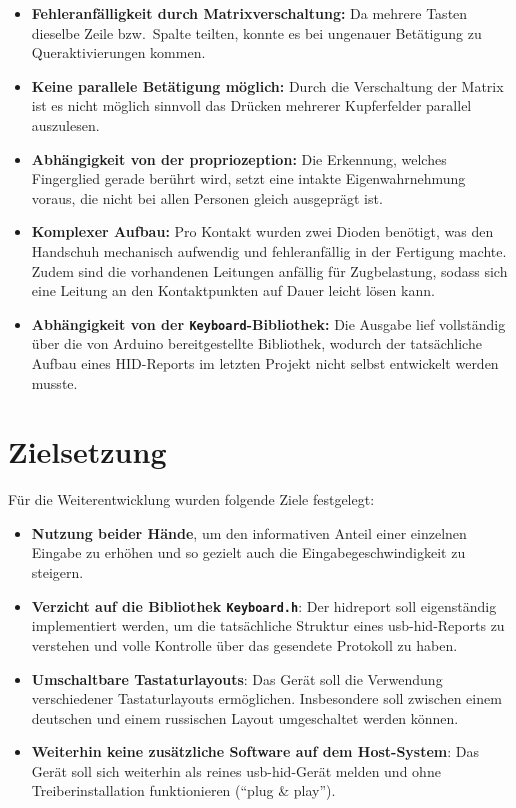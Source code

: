 \documentclass{article}
\begin{document}
\begin{itemize}
    \item \textbf{Fehleranfälligkeit durch Matrixverschaltung:} Da mehrere Tasten dieselbe Zeile bzw.\ Spalte teilten, konnte es bei ungenauer Betätigung zu Queraktivierungen kommen.
    \item \textbf{Keine parallele Betätigung möglich:} Durch die Verschaltung der Matrix ist es nicht möglich sinnvoll das Drücken mehrerer Kupferfelder parallel auszulesen.
    \item \textbf{Abhängigkeit von der \gls{propriozeption}:} Die Erkennung, welches Fingerglied gerade berührt wird, setzt eine intakte Eigenwahrnehmung voraus, die nicht bei allen Personen gleich ausgeprägt ist.
    \item \textbf{Komplexer Aufbau:} Pro Kontakt wurden zwei Dioden benötigt, was den Handschuh mechanisch aufwendig und fehleranfällig in der Fertigung machte. Zudem sind die vorhandenen Leitungen anfällig für Zugbelastung, sodass sich eine Leitung an den Kontaktpunkten auf Dauer leicht lösen kann.
    \item \textbf{Abhängigkeit von der \texttt{Keyboard}-Bibliothek:} Die Ausgabe lief vollständig über die von Arduino bereitgestellte Bibliothek, wodurch der tatsächliche Aufbau eines HID-Reports im letzten Projekt nicht selbst entwickelt werden musste.
\end{itemize}

\section{Zielsetzung}
\label{sec:zielsetzung}
Für die Weiterentwicklung wurden folgende Ziele festgelegt:

\begin{itemize}
    \item \textbf{Nutzung beider Hände}, um den informativen Anteil einer einzelnen Eingabe zu erhöhen und so gezielt auch die Eingabegeschwindigkeit zu steigern.
    \item \textbf{Verzicht auf die Bibliothek \texttt{Keyboard.h}}: Der \gls{hidreport} soll eigenständig implementiert werden, um die tatsächliche Struktur eines \gls{usb-hid}-Reports zu verstehen und volle Kontrolle über das gesendete Protokoll zu haben.
    \item \textbf{Umschaltbare Tastaturlayouts}: Das Gerät soll die Verwendung verschiedener Tastaturlayouts ermöglichen. Insbesondere soll zwischen einem deutschen und einem russischen Layout umgeschaltet werden können.
    \item \textbf{Weiterhin keine zusätzliche Software auf dem Host-System}: Das Gerät soll sich weiterhin als reines \gls{usb-hid}-Gerät melden und ohne Treiberinstallation funktionieren (\enquote{plug \& play}).
\end{itemize}
\end{document}
